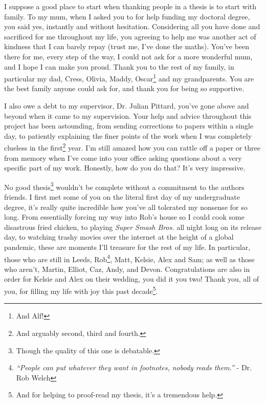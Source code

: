 

\begin{acknowledgements}      %

\setlength{\parindent}{17.62482pt}
\setlength{\parskip}{0.0pt plus 1.0pt}


I suppose a good place to start when thanking people in a thesis is to start with family.
To my mum, when I asked you to for help funding my doctoral degree, you said yes, instantly and without hesitation.
Considering all you have done and sacrificed for me throughout my life, you agreeing to help me was another act of kindness that I can barely repay (trust me, I've done the maths).
You've been there for me, every step of the way, I could not ask for a more wonderful mum, and I hope I can make you proud.
Thank you to the rest of my family, in particular my dad, Cress, Olivia, Maddy, Oscar\footnote{And Alf!} and my grandparents.
You are the best family anyone could ask for, and thank you for being so supportive.

I also owe a debt to my supervisor, Dr. Julian Pittard, you've gone above and beyond when it came to my supervision.
Your help and advice throughout this project has been astounding, from sending corrections to papers within a single day, to patiently explaining the finer points of the work when I was completely clueless in the first\footnote{And arguably second, third and fourth.} year.
I'm still amazed how you can rattle off a paper or three from memory when I've come into your office asking questions about a very specific part of my work.
Honestly, how do you do that? It's very impressive.

No good thesis\footnote{Though the quality of this one is debatable.} wouldn't be complete without a commitment to the authors friends.
I first met some of you on the literal first day of my undergraduate degree, it's really quite incredible how you've all tolerated my nonsense for so long.
From essentially forcing my way into Rob's house so I could cook some disastrous fried chicken, to playing \textit{Super Smash Bros.} all night long on its release day, to watching trashy movies over the internet at the height of a global pandemic, these are moments I'll treasure for the rest of my life.
In particular, those who are still in Leeds, Rob\footnote{\emph{``People can put whatever they want in footnotes, nobody reads them.''} - Dr. Rob Welch}, Matt, Kelsie, Alex and Sam; as well as those who aren't, Martin, Elliot, Caz, Andy, and Devon.
Congratulations are also in order for Kelsie and Alex on their wedding, you did it you two!
Thank you, all of you, for filling my life with joy this past decade\footnote{And for helping to proof-read my thesis, it's a tremendous help.}.


\end{acknowledgements}
